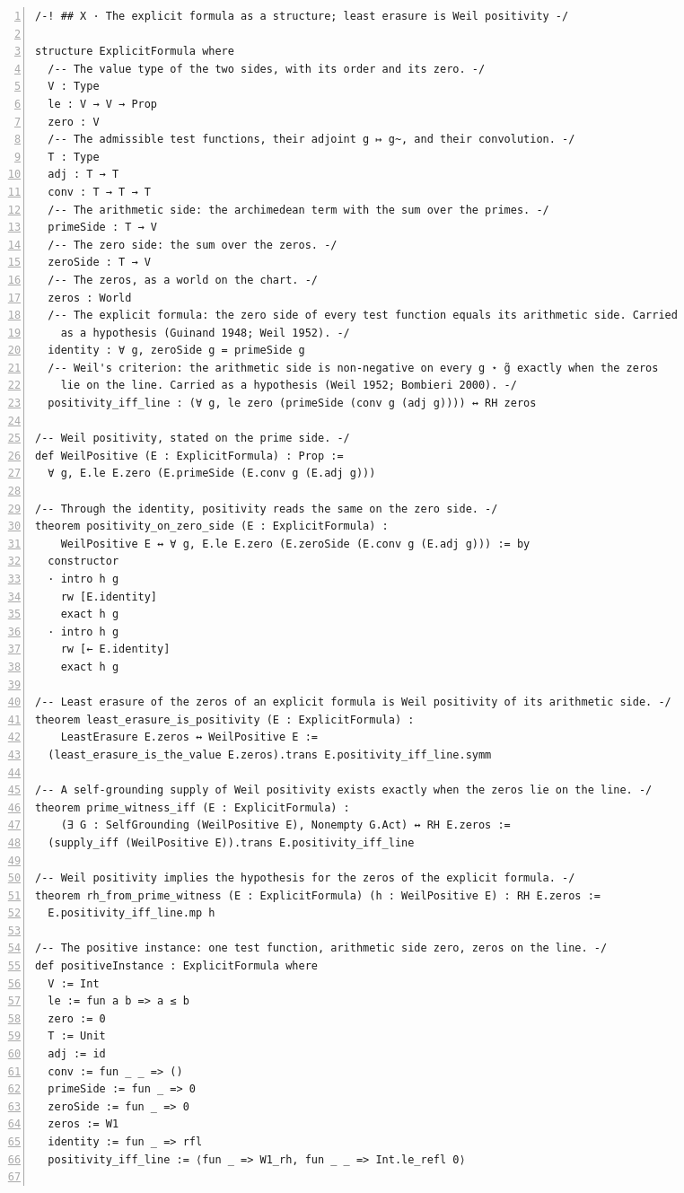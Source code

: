 \documentclass[10pt]{article}
\newcommand{\leansize}{\fontsize{5.5pt}{6.75pt}\selectfont}
\begin{document}
\begin{multicols}{2}
\begin{Verbatim}[numbers=left,firstnumber=1,numbersep=3pt,xleftmargin=2.6em,breaklines=true,breakanywhere=true,breakautoindent=false,breakindent=1.4em,breaksymbolleft={},breakanywheresymbolpre={},fontsize=\leansize]
/-! ## X · The explicit formula as a structure; least erasure is Weil positivity -/

structure ExplicitFormula where
  /-- The value type of the two sides, with its order and its zero. -/
  V : Type
  le : V → V → Prop
  zero : V
  /-- The admissible test functions, their adjoint g ↦ g~, and their convolution. -/
  T : Type
  adj : T → T
  conv : T → T → T
  /-- The arithmetic side: the archimedean term with the sum over the primes. -/
  primeSide : T → V
  /-- The zero side: the sum over the zeros. -/
  zeroSide : T → V
  /-- The zeros, as a world on the chart. -/
  zeros : World
  /-- The explicit formula: the zero side of every test function equals its arithmetic side. Carried
    as a hypothesis (Guinand 1948; Weil 1952). -/
  identity : ∀ g, zeroSide g = primeSide g
  /-- Weil's criterion: the arithmetic side is non-negative on every g ⋆ g̃ exactly when the zeros
    lie on the line. Carried as a hypothesis (Weil 1952; Bombieri 2000). -/
  positivity_iff_line : (∀ g, le zero (primeSide (conv g (adj g)))) ↔ RH zeros

/-- Weil positivity, stated on the prime side. -/
def WeilPositive (E : ExplicitFormula) : Prop :=
  ∀ g, E.le E.zero (E.primeSide (E.conv g (E.adj g)))

/-- Through the identity, positivity reads the same on the zero side. -/
theorem positivity_on_zero_side (E : ExplicitFormula) :
    WeilPositive E ↔ ∀ g, E.le E.zero (E.zeroSide (E.conv g (E.adj g))) := by
  constructor
  · intro h g
    rw [E.identity]
    exact h g
  · intro h g
    rw [← E.identity]
    exact h g

/-- Least erasure of the zeros of an explicit formula is Weil positivity of its arithmetic side. -/
theorem least_erasure_is_positivity (E : ExplicitFormula) :
    LeastErasure E.zeros ↔ WeilPositive E :=
  (least_erasure_is_the_value E.zeros).trans E.positivity_iff_line.symm

/-- A self-grounding supply of Weil positivity exists exactly when the zeros lie on the line. -/
theorem prime_witness_iff (E : ExplicitFormula) :
    (∃ G : SelfGrounding (WeilPositive E), Nonempty G.Act) ↔ RH E.zeros :=
  (supply_iff (WeilPositive E)).trans E.positivity_iff_line

/-- Weil positivity implies the hypothesis for the zeros of the explicit formula. -/
theorem rh_from_prime_witness (E : ExplicitFormula) (h : WeilPositive E) : RH E.zeros :=
  E.positivity_iff_line.mp h

/-- The positive instance: one test function, arithmetic side zero, zeros on the line. -/
def positiveInstance : ExplicitFormula where
  V := Int
  le := fun a b => a ≤ b
  zero := 0
  T := Unit
  adj := id
  conv := fun _ _ => ()
  primeSide := fun _ => 0
  zeroSide := fun _ => 0
  zeros := W1
  identity := fun _ => rfl
  positivity_iff_line := ⟨fun _ => W1_rh, fun _ _ => Int.le_refl 0⟩


\end{Verbatim}
\end{multicols}
\end{document}
